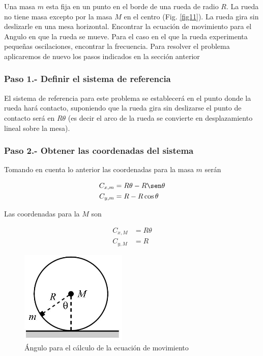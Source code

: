 \documentclass[12pt]{book}
\theoremstyle{definition}
\theoremstyle{remark}
\theoremstyle{plain}
\begin{document}
Una masa $m$ esta fija en un punto en el borde de una rueda de radio $R$. La rueda no tiene masa excepto por la masa $M$ en el centro (Fig. \ref{fig11}). La rueda gira sin deslizarle en una mesa horizontal. Encontrar la ecuación de movimiento para el Angulo en que la rueda se mueve. Para el caso en el que la rueda experimenta pequeñas oscilaciones, encontrar la frecuencia.
Para resolver el problema aplicaremos de nuevo los pasos indicados en la sección anterior

\subsubsection{Paso 1.- Definir el sistema de referencia}

El sistema de referencia para este problema se establecerá en el punto donde la rueda hará contacto, suponiendo que la rueda gira sin deslizarse el punto de contacto será en $R \theta$ (es decir el arco de la rueda se convierte en desplazamiento lineal sobre la mesa). 

\subsubsection{Paso 2.- Obtener las coordenadas del sistema }

Tomando en cuenta lo anterior las coordenadas para la masa $m$ serán 

\begin{equation}
\label{equ230}
\begin{aligned}
C_{x,m} & =R \theta - R \sen \theta \\
C_{y,m} & =R- R \cos \theta
\end{aligned}
\end{equation}

Las coordenadas para la $M$ son

\begin{equation}
\label{equ231}
\begin{aligned}
C_{x,M} & =R \theta  \\
C_{y,M} & =R
\end{aligned}
\end{equation}

\begin{figure}
\centering
\includegraphics[width=2in]{Angulorueda.jpeg}
\caption{Ángulo para el cálculo de la ecuación de movimiento}
\label{fig12}
\end{figure}
\end{document}
